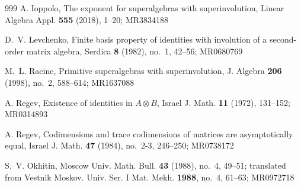 \documentclass[11pt]{amsart}
\theoremstyle{definition}
\theoremstyle{remark}
\begin{document}
\begin{thebibliography}{999}
 A. Ioppolo, The exponent for superalgebras with superinvolution, Linear Algebra Appl. {\bf 555} (2018), 1--20; MR3834188

 D.~V. Levchenko, Finite basis property of identities with involution of a second-order matrix algebra, Serdica {\bf 8} (1982), no.~1, 42--56; MR0680769

 M.~L. Racine, Primitive superalgebras with superinvolution, J. Algebra {\bf 206} (1998), no.~2, 588--614; MR1637088

 A. Regev, Existence of identities in $A\otimes B$, Israel J. Math. {\bf 11} (1972), 131--152; MR0314893

 A. Regev, Codimensions and trace codimensions of matrices are asymptotically equal, Israel J. Math. {\bf 47} (1984), no.~2-3, 246--250; MR0738172

 S.~V. Okhitin, Moscow Univ. Math. Bull. {\bf 43} (1988), no.~4, 49--51; translated from Vestnik Moskov. Univ. Ser. I Mat. Mekh. {\bf 1988}, no.~4, 61--63; MR0972718

\end{thebibliography}
\end{document}

